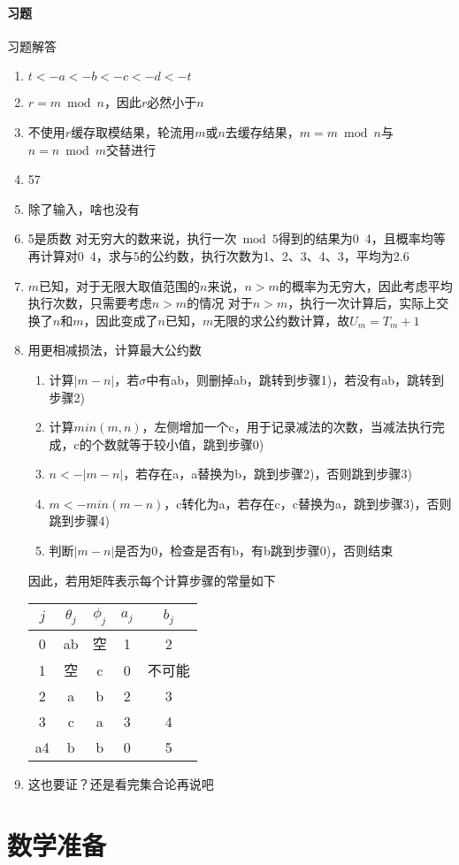 \documentclass[openany,UTF8]{ctexbook}
\begin{document}
\paragraph{习题}
习题解答
\begin{enumerate}
\item $t <- a <- b <- c <- d <- t $
\item $r=m \bmod n$，因此$r$必然小于$n$
\item 不使用$r$缓存取模结果，轮流用$m$或$n$去缓存结果，$m=m \bmod n$与$n=n \bmod m$交替进行
\item 57
\item 除了输入，啥也没有
\item 5是质数
  对无穷大的数来说，执行一次$\bmod 5$得到的结果为0~4，且概率均等
  再计算对0~4，求与5的公约数，执行次数为1、2、3、4、3，平均为2.6
\item $m$已知，对于无限大取值范围的$n$来说，$n>m$的概率为无穷大，因此考虑平均执行次数，只需要考虑$n>m$的情况
  对于$n>m$，执行一次计算后，实际上交换了$n$和$m$，因此变成了$n$已知，$m$无限的求公约数计算，故$U_m=T_m+1$
\item 用更相减损法，计算最大公约数
  \begin{enumerate}[label=\arabic*)] 
  \item 计算$\left| m-n \right|$，若$\sigma$中有ab，则删掉ab，跳转到步骤1)，若没有ab，跳转到步骤2)
  \item 计算$min(m,n)$，左侧增加一个c，用于记录减法的次数，当减法执行完成，c的个数就等于较小值，跳到步骤0)
  \item $n<-\left| m-n \right|$，若存在a，a替换为b，跳到步骤2)，否则跳到步骤3)
  \item $m<- min(m-n)$，c转化为a，若存在c，c替换为a，跳到步骤3)，否则跳到步骤4)
  \item 判断$\left| m-n \right|$是否为0，检查是否有b，有b跳到步骤0)，否则结束
  \end{enumerate}
  因此，若用矩阵表示每个计算步骤的常量如下\\
  \begin{center}
    \begin{tabular}{c|c|c|c|c}
      \hline
      $j$&$\theta_j$&$\phi_j$&$a_j$&$b_j$\\
      \hline
      0&ab&空&1&2\\
      1&空&c&0&不可能\\
      2&a&b&2&3\\
      3&c&a&3&4\\
      a4&b&b&0&5\\
      \hline
    \end{tabular}
  \end{center}
\item 这也要证？还是看完集合论再说吧
\end{enumerate}

\section{数学准备}
\end{document}
